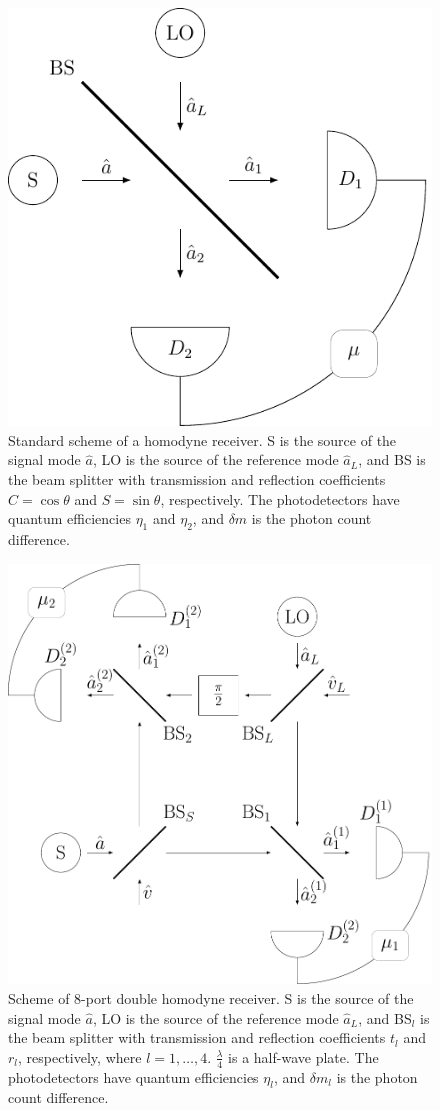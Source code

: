 \documentclass[]{article}
\begin{document}
\begin{figure}
    \centering
    \includegraphics[width=0.75\linewidth]{pics/schemes/homodyne.pdf}
    \caption{Standard scheme of a homodyne receiver. S is the source of the signal mode $\hat{a}$, LO is the source of the reference mode $\hat{a}_{L}$, and BS is the beam splitter with transmission and reflection coefficients {$C=\cos\theta$ and $S=\sin\theta$}, respectively. The photodetectors have quantum efficiencies $\eta_{1}$ and $\eta_{2}$, and $\delta m$ is the photon count difference.}
    \label{fig:homodyne}
\end{figure}



\begin{figure}
    \centering
    \includegraphics[width=0.75\linewidth]{pics/schemes/double_homodyne.pdf}
    \caption{Scheme of 8-port double homodyne receiver. S is the source of the signal mode $\hat{a}$, LO is the source of the reference mode $\hat{a}_{L}$, and BS$_l$ is the beam splitter with transmission and reflection coefficients $t_l$ and $r_l$, respectively, where $l=1,\ldots,4$. $\frac{\lambda}{4}$ is a half-wave plate. The photodetectors have quantum efficiencies $\eta_{l}$, and $\delta m_l$ is the photon count difference.}
    \label{fig:double-homodyne}
\end{figure}
\end{document}
